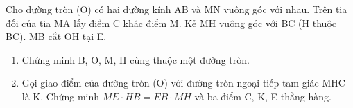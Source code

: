 \begin{ex}
Cho đường tròn (O) có hai đường kính AB và MN vuông góc với nhau. Trên tia đối của tia MA lấy điểm C khác điểm M. Kẻ MH vuông góc với BC (H thuộc BC). MB cắt OH tại E.
	\begin{enumerate}
		\item[a)] Chứng minh B, O, M, H cùng thuộc một đường tròn.
		\item[b)] Gọi giao điểm của đường tròn (O) với đường tròn ngoại tiếp tam giác MHC là K. Chứng minh $ME \cdot HB = EB \cdot MH$ và ba điểm C, K, E thẳng hàng.
	\end{enumerate}
\end{ex}
